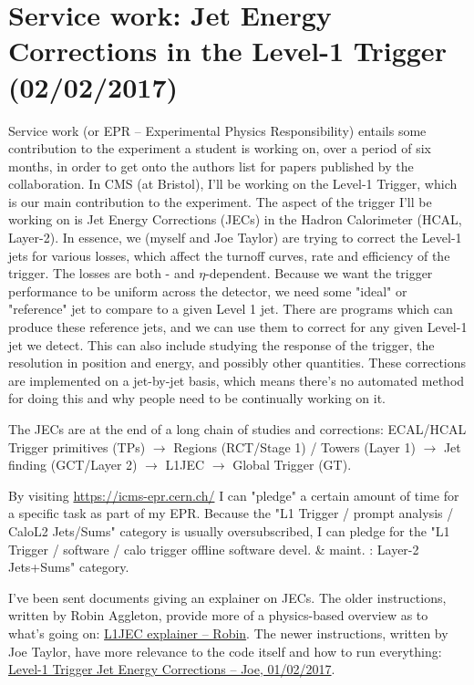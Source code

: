 
\chapter{Service work: Jet Energy Corrections in the Level-1 Trigger (02/02/2017)}

Service work (or EPR -- Experimental Physics Responsibility) entails some contribution to the experiment a student is working on, over a period of six months, in order to get onto the authors list for papers published by the collaboration. In CMS (at Bristol), I'll be working on the Level-1 Trigger, which is our main contribution to the experiment. The aspect of the trigger I'll be working on is Jet Energy Corrections (JECs) in the Hadron Calorimeter (HCAL, Layer-2). In essence, we (myself and Joe Taylor) are trying to correct the Level-1 jets for various losses, which affect the turnoff curves, rate and efficiency of the trigger. The losses are both \pt- and $\eta$-dependent. Because we want the trigger performance to be uniform across the detector, we need some "ideal" or "reference" jet to compare to a given Level 1 jet. There are programs which can produce these reference jets, and we can use them to correct for any given Level-1 jet we detect. This can also include studying the response of the trigger, the resolution in position and energy, and possibly other quantities. These corrections are implemented on a jet-by-jet basis, which means there's no automated method for doing this and why people need to be continually working on it.

The JECs are at the end of a long chain of studies and corrections: ECAL/HCAL Trigger primitives (TPs) $\rightarrow$ Regions (RCT/Stage 1) / Towers (Layer 1) $\rightarrow$ Jet finding (GCT/Layer 2) $\rightarrow$ L1JEC $\rightarrow$ Global Trigger (GT).

By visiting \url{https://icms-epr.cern.ch/} I can "pledge" a certain amount of time for a specific task as part of my EPR. Because the "L1 Trigger / prompt analysis / CaloL2 Jets/Sums" category is usually oversubscribed, I can pledge for the "L1 Trigger / software / calo trigger offline software devel. \& maint. : Layer-2 Jets+Sums" category. 

I've been sent documents giving an explainer on JECs. The older instructions, written by Robin Aggleton, provide more of a physics-based overview as to what's going on: \href{run:modules/Sec 20 - Service Work Jet Energy Corrections/figures/l1jec_explainer.pdf}{L1JEC explainer -- Robin}. The newer instructions, written by Joe Taylor, have more relevance to the code itself and how to run everything: \href{run:modules/Sec 20 - Service Work Jet Energy Corrections/figures/2017_02_01_L1JECinstructions.pdf}{Level-1 Trigger Jet Energy Corrections -- Joe, 01/02/2017}.

